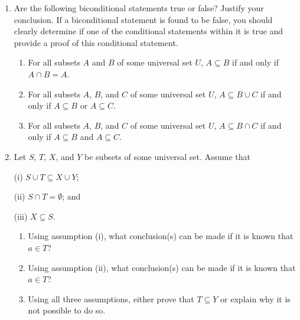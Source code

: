 \begin{enumerate}
\item Are the following biconditional statements true or false?  Justify your conclusion.  If a biconditional statement is found to be false, you should clearly determine if one of the conditional statements within it is true and provide a proof of this conditional statement.
\label{exer42:setstruefalse}
 
\begin{enumerate}
\yitem For all subsets  $A$  and  $B$ of some universal set  $U$\!,  $A \subseteq B$ if and only if  
$A \cap B^c = \emptyset$.

\yitem For all subsets  $A$  and  $B$ of some universal set  $U$\!,  $A \subseteq B$ if and only if  
$A \cup B = B$.

\item For all subsets  $A$  and  $B$ of some universal set  $U$\!,  $A \subseteq B$ if and only if  
$A \cap B = A$.

\item For all subsets  $A$, $B$, and $C$ of some universal set  $U$\!,  $A \subseteq B \cup C$ if and only if  $A \subseteq B$ or $A \subseteq C$\!.

\item For all subsets  $A$, $B$, and $C$ of some universal set  $U$\!,  $A \subseteq B \cap C$ if and only if  $A \subseteq B$ and $A \subseteq C$\!.
\end{enumerate}

\item Let $S$, $T$, $X$, and $Y$ be subsets of some universal set.  Assume that

\begin{multicols}{3}
(i) $S \cup T \subseteq X \cup Y$\!;

(ii) $S \cap T = \emptyset$; and

(iii) $X \subseteq S$\!.
\end{multicols}

\begin{enumerate}
\item Using assumption (i), what conclusion(s) can be made if it is known that $a \in T$?

\item Using assumption (ii), what conclusion(s) can be made if it is known that $a \in T$?

\item Using all three assumptions, either prove that $T \subseteq Y$ or explain why it is not possible to do so.
\end{enumerate}



\end{enumerate}

